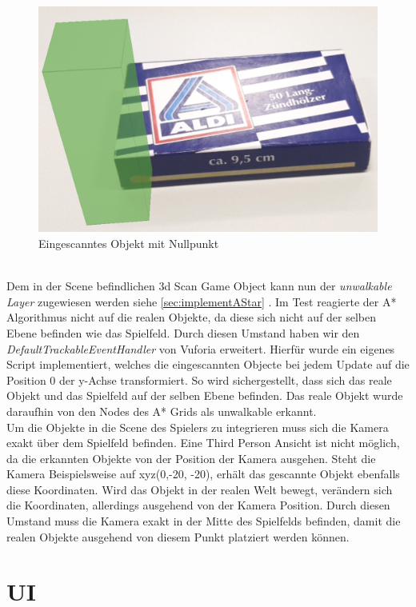\begin{figure}[h]
    \centering
    \includegraphics[width=0.5\linewidth]{assets/matches.png}
    \caption{Eingescanntes Objekt mit Nullpunkt}\label{fig:matches}
\end{figure}\\
Dem in der Scene befindlichen 3d Scan Game Object kann nun der \textit{unwalkable Layer} zugewiesen werden siehe \ref{sec:implementAStar} . Im Test reagierte der A* Algorithmus nicht auf die realen Objekte, da diese sich nicht auf der selben Ebene befinden wie das Spielfeld. Durch diesen Umstand haben wir den \textit{DefaultTrackableEventHandler} von Vuforia erweitert. Hierfür wurde ein eigenes Script implementiert, welches die eingescannten Objecte bei jedem Update auf die Position 0 der y-Achse transformiert. So wird sichergestellt, dass sich das reale Objekt und das Spielfeld auf der selben Ebene befinden. Das reale Objekt wurde daraufhin von den Nodes des A* Grids als unwalkable erkannt. \\
Um die Objekte in die Scene des Spielers zu integrieren muss sich die Kamera exakt über dem Spielfeld befinden. Eine Third Person Ansicht ist nicht möglich, da die erkannten Objekte von der Position der Kamera ausgehen. Steht die Kamera Beispielsweise auf xyz(0,-20, -20), erhält das gescannte Objekt ebenfalls diese Koordinaten. Wird das Objekt in der realen Welt bewegt, verändern sich die Koordinaten, allerdings ausgehend von der Kamera Position. Durch diesen Umstand muss die Kamera exakt in der Mitte des Spielfelds befinden, damit die realen Objekte ausgehend von diesem Punkt platziert werden können.

\section{UI}

